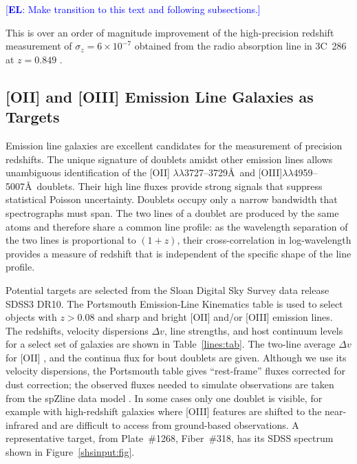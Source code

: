 \documentclass[preprint2, 10pt]{aastex}
\newcommand{\eric}[1]{\textcolor{blue}{[{\bf EL}: #1]}}
\begin{document}



\eric{Make transition to this text and following subsections.} 

This is over an order of magnitude improvement
of the high-precision redshift measurement of  $\sigma_z=6\times 10^{-7}$ obtained
from the radio absorption line in 3C~286 at $z=0.849$
\citep{1978ApJ...219....1D}.

\subsection{[OII] and [OIII] Emission Line Galaxies as Targets}
Emission line galaxies are excellent candidates for the measurement of precision redshifts.
The unique signature
of doublets amidst  other emission lines allows unambiguous identification of the [OII] $\lambda\lambda$3727--3729\AA\ 
and [OIII]$\lambda\lambda$4959--5007\AA\ doublets.
Their high line fluxes provide strong signals that suppress statistical Poisson uncertainty.
Doublets occupy only a narrow bandwidth that spectrographs must span.
The two lines of a doublet are produced by the same atoms and therefore
share a common line profile: as the wavelength separation of the two lines is proportional to $(1+z)$, their cross-correlation in log-wavelength
provides a measure of redshift that is independent of the specific shape of the line profile.

Potential targets are selected from the Sloan Digital Sky Survey data release SDSS3 DR10.  The  Portsmouth Emission-Line Kinematics table \citep{2013MNRAS.431.1383T}  is used to select
objects 
with $z>0.08$
and sharp and bright [OII] and/or [OIII] emission lines.
The redshifts, velocity dispersions $\Delta v$, line strengths, and host continuum levels for a select set of galaxies are shown in Table~\ref{lines:tab}. 
The two-line average $\Delta v$ for [OII] , and the continua flux for bout doublets  are given.
Although we use its velocity dispersions, the Portsmouth table  gives ``rest-frame'' fluxes corrected for dust correction;
the observed fluxes needed to simulate observations are taken from the spZline data model
\citep{2012AJ....144..144B}.  In some cases only one doublet is visible, for example with high-redshift galaxies where [OIII] features are shifted to the near-infrared and are difficult to access from ground-based observations.
A representative 
target, from Plate~\#1268, Fiber~\#318, has its  SDSS spectrum shown in Figure~\ref{shsinput:fig}.
\end{document}

